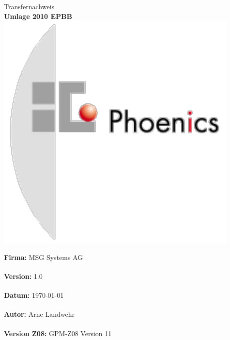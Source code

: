 \begin{titlepage}
\vspace{1cm}
\begin{center}
\huge
Transfernachweis\\
\vspace{2cm}
\textbf{Umlage 2010 EPBB}
\vspace{1cm}
\includegraphics{Bilder/phoenics_logo}
\vspace{1cm}
\end{center}
\large
\textbf{Firma:} \hspace{2 cm}MSG Systems AG\\
\\
\textbf{Version:} \hspace{1,5 cm} 1.0\\
\\
\textbf{Datum:}  \hspace{1,55 cm} \today \\
\\
\textbf{Autor:} \hspace{2cm }Arne Landwehr\\
\\
\textbf{Version Z08:} \hspace{0,3cm } GPM-Z08 Version 11\\
\\
\end{titlepage}


